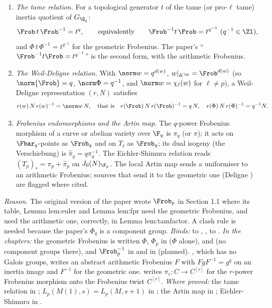 \begin{convention}
\begin{enumerate}[label=(\alph*)]
geometric Frobenius for $L$-factors and call it $\Frob_p$.
\item \emph{The tame relation.} For a topological generator $t$ of the tame (or pro-$\ell$ tame) inertia quotient of $G_{\Q_q}$:
\[
\Frob\,t\,\Frob^{-1}=t^{q},\qquad\text{equivalently}\qquad\Frob^{-1}t\,\Frob=t^{q^{-1}}\ (q^{-1}\in\Zl),
\]
and $\Phi\,t\,\Phi^{-1}=t^{q^{-1}}$ for the geometric Frobenius.
The paper's ``$\Frob^{-1}t\Frob=t^{q^{-1}}$'' is the second form, with the arithmetic Frobenius.
\item \emph{The Weil-Deligne relation.} With $\norm w=q^{d(w)}$, $w|_{K^{\ur}}=\Frob^{d(w)}$ (so $\norm{\Frob}=q$, $\norm\Phi=q^{-1}$, and
$\norm w=\chi_\ell(w)$ for $\ell\ne p$), a Weil-Deligne representation $(r,N)$ satisfies
\[
r(w)\,N\,r(w)^{-1}=\norm w\,N,\quad\text{that is}\quad r(\Frob)\,N\,r(\Frob)^{-1}=q\,N,\quad r(\Phi)\,N\,r(\Phi)^{-1}=q^{-1}N.
\]
\item \emph{Frobenius endomorphisms and the Artin map.} The $q$-power Frobenius morphism of a curve or abelian variety over $\F_q$
is $\pi_q$ (or $\pi$); it acts on $\Fbar_q$-points as $\Frob_q$ and on $T_\ell$ as $\Frob_q$; its dual isogeny (the Verschiebung) is
$\hat\pi_q=q\pi_q^{-1}$. The Eichler-Shimura relation reads $(T_p)_*=\pi_p+\hat\pi_p$ on $J_0(N)_{\F_p}$. The local Artin map sends a
uniformiser to an arithmetic Frobenius; sources that send it to the geometric one (Deligne \cite{Deligne73}) are flagged where
cited.
\end{enumerate}
\end{convention}

\noindent\emph{Reason.} The original version of the paper wrote $\Frob_p$ in Section 1.1 where its table, Lemma lem:euler and
Lemma lem:fpr need the geometric Frobenius, and used the arithmetic one, correctly, in Lemma lem:tamfactor. A clash rule is
needed because the paper's $\Phi_q$ is a component group. \emph{Binds:}  to ,
,  to . \emph{In the chapters:} the geometric Frobenius is written $\Phi$,
$\Phi_p$ in  ($\Phi$ alone),  and  (no component groups there), and
$\Frob_p^{-1}$ in 
and in  (planned). , which has no Galois groups, writes an abstract arithmetic Frobenius $F$ with
$FgF^{-1}=g^q$ on an inertia image and $F^{-1}$ for the geometric one.  writes $\pi_r\colon C\to C^{[r]}$ for the
$r$-power Frobenius morphism onto the Frobenius twist $C^{[r]}$. \emph{Where proved:} the tame relation in ;
$L_p(M(1),s)=L_p(M,s+1)$ in ; the Artin map in ; Eichler-Shimura in .

